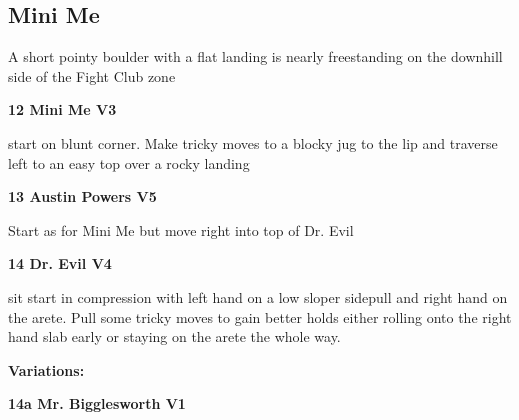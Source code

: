 \begin{multicols}{2}
\begin{minipage}{\columnwidth}
			\subsection*{Mini Me}\label{bf:Mini Me}
			A short pointy boulder with a flat landing is nearly freestanding on the downhill side of the Fight Club zone
			
			\end{minipage}
			
					\begin{minipage}{\linewidth}	
					\label{rt:Mini Me}
\colorbox{green!20}{
\parbox{0.95\textwidth}{
\textbf{
12 Mini Me V3  
}
}
}

					\begin{adjustwidth}{0.5cm}{}				
					start on blunt corner. Make tricky moves to a blocky jug to the lip and traverse left to an easy top over a rocky landing
					\end{adjustwidth}
					\end{minipage}
					\begin{minipage}{\linewidth}	
					\label{rt:Austin Powers}
\colorbox{RoyalBlue!20}{
\parbox{0.95\textwidth}{
\textbf{
13 Austin Powers V5    
}
}
}

					\begin{adjustwidth}{0.5cm}{}				
					Start as for Mini Me but move right into top of Dr. Evil
					\end{adjustwidth}
					\end{minipage}

					\begin{minipage}{\linewidth}	
					\label{rt:Dr. Evil}
\colorbox{RoyalBlue!20}{
\parbox{0.95\textwidth}{
\textbf{
14 Dr. Evil V4    
}
}
}

					\begin{adjustwidth}{0.5cm}{}				
					sit start in compression with left hand on a low sloper sidepull and right hand on the arete. Pull some tricky moves to gain better holds either rolling onto the right hand slab early or staying on the arete the whole way.
					\end{adjustwidth}
					\end{minipage}
						\begin{adjustwidth}{0.5cm}{}				
						\textbf{Variations:} \newline
							\begin{minipage}{\linewidth}	
							\label{vr:Mr. Bigglesworth}
\colorbox{green!20}{
\parbox{0.95\textwidth}{
\textbf{
14a Mr. Bigglesworth V1    
}
}
}


\end{minipage}
\end{adjustwidth}
\end{multicols}
